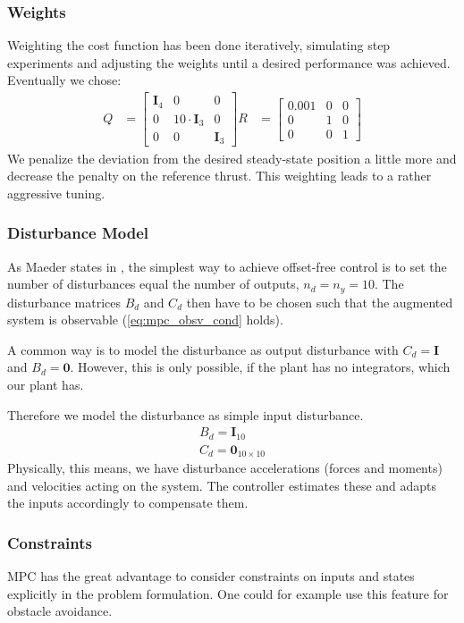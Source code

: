 \subsubsection{Weights}
Weighting the cost function has been done iteratively, simulating step experiments and adjusting the weights until a desired performance was achieved. Eventually we chose:
\begin{align}
Q &= \begin{bmatrix}
\mathbf{I}_4 & 0 & 0 \\
0 & 10\cdot\mathbf{I}_3 & 0 \\
0 & 0 & \mathbf{I}_3
\end{bmatrix}
R &= \begin{bmatrix}
0.001 & 0 & 0 \\
0 & 1 & 0 \\
0 & 0 & 1
\end{bmatrix}
\end{align}
We penalize the deviation from the desired steady-state position a little more and decrease the penalty on the reference thrust. This weighting leads to a rather aggressive tuning.
\subsubsection{Disturbance Model}
\label{sec:mpc_dist}
As Maeder states in \cite{Maeder2009}, the simplest way to achieve offset-free control is to set the number of disturbances equal the number of outputs, $n_d=n_y=10$. The disturbance matrices $B_d$ and $C_d$ then have to be chosen such that the augmented system is observable (\ref{eq:mpc_obsv_cond} holds).

A common way is to model the disturbance as output disturbance with $C_d=\mathbf{I}$ and $B_d= \mathbf{0}$. However, this is only possible, if the plant has no integrators, which our plant has.

Therefore we model the disturbance as simple input disturbance.
\begin{align}
B_d = \mathbf{I}_{10} \\
C_d = \mathbf{0}_{10\times10}
\end{align}
Physically, this means, we have disturbance accelerations (forces and moments) and velocities acting on the system. The controller estimates these and adapts the inputs accordingly to compensate them.
\subsubsection{Constraints}
MPC has the great advantage to consider constraints on inputs and states explicitly in the problem formulation. One could for example use this feature for obstacle avoidance.

